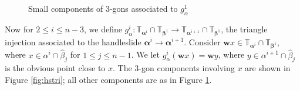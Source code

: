 \documentclass[11pt]{article}
\theoremstyle{plain} \newtheorem{thm}{Theorem}[subsection]
\theoremstyle{plain} \newtheorem{cor}[thm]{Corollary}
\theoremstyle{plain} \newtheorem{prop}[thm]{Proposition}
\theoremstyle{plain} \newtheorem{conj}[thm]{Conjecture}
\theoremstyle{plain} \newtheorem{lem}[thm]{Lemma}
\theoremstyle{definition} \newtheorem{df}[thm]{Definition}
\theoremstyle{remark} \newtheorem{rmk}[thm]{Remark}
\theoremstyle{remark} \newtheorem{obs}[thm]{Observation}
\newcommand{\bh}{\widehat{\beta}}
\newcommand{\ba}{\boldsymbol{\alpha}}
\newcommand{\bb}{\boldsymbol{\beta}}
\newcommand{\bw}{\mathbf{w}}
\newcommand{\tor}[1]{\mathbb{T}_{#1}}
\numberwithin{equation}{section}
\begin{document}
\begin{figure}[h]
\centering
\begin{minipage}[c]{.45\linewidth}
\quad
{}
\end{minipage}
\begin{minipage}[c]{.50\linewidth}
\caption[Small components of 3-gons for $g_{\alpha}^1$ in the proof of Lemma \ref{lem:RredR}]{Small components of 3-gons associated to $g_{\alpha}^1$\label{fig:isotri}}
\end{minipage}
\end{figure}

Now for $2 \leq i \leq n-3$, we define $g_{\alpha}^i:\tor{\ba^i} \cap \tor{\bb^1} \rightarrow \tor{\ba^{i+1}} \cap \tor{\bb^1}$, the triangle injection associated to the handleslide $\ba^i \rightarrow \ba^{i+1}$.  Consider $\bw x \in \tor{\ba^i} \cap \tor{\bb^1}$, where $x \in \alpha^i \cap \bh_j$ for $1 \leq j \leq n-1$.  We let $g_{\alpha}^i(\bw x) = \bw y$, where $y \in \alpha^{i+1} \cap \bh_j$ is the obvious point close to $x$.  The 3-gon components involving $x$ are shown in Figure \ref{fig:hstri}; all other components are as in Figure \ref{fig:isotri}.
\end{document}
